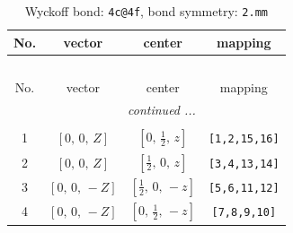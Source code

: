 \documentclass[fleqn,8pt]{jsarticle}
\begin{document}
\renewcommand{\arraystretch}{1.2}
\begin{longtable}{cccc}
\caption{Wyckoff bond: {\tt 4c@4f}, bond symmetry: {\tt 2.mm}}
 \\
 \hline \hline
No. & vector & center & mapping \\ \hline \endfirsthead

\multicolumn{3}{l}{\tablename\ \thetable{}} \\
 \hline \hline
No. & vector & center & mapping \\ \hline \endhead

 \hline \hline
\multicolumn{3}{r}{\footnotesize\it continued ...} \\ \endfoot

 \hline \hline
\multicolumn{3}{r}{} \\ \endlastfoot

1 & $\left[ 0,\, 0,\, Z \right]$ & $\left[ 0,\, \frac{1}{2},\, z \right]$ & {\tt [1,2,15,16]} \\ \hline
2 & $\left[ 0,\, 0,\, Z \right]$ & $\left[ \frac{1}{2},\, 0,\, z \right]$ & {\tt [3,4,13,14]} \\ \hline
3 & $\left[ 0,\, 0,\, - Z \right]$ & $\left[ \frac{1}{2},\, 0,\, - z \right]$ & {\tt [5,6,11,12]} \\ \hline
4 & $\left[ 0,\, 0,\, - Z \right]$ & $\left[ 0,\, \frac{1}{2},\, - z \right]$ & {\tt [7,8,9,10]} \\
\end{longtable}
\renewcommand{\arraystretch}{1.2}
\end{document}
